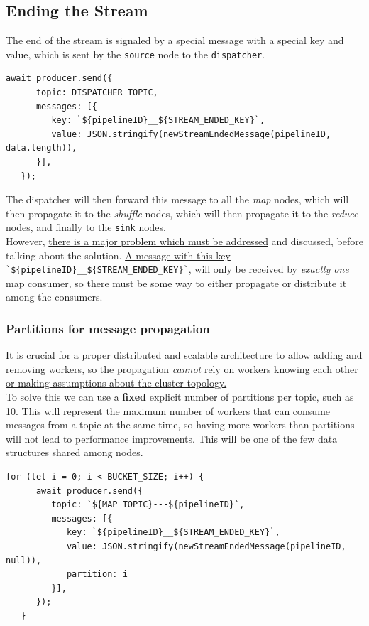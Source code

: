 \subsection{Ending the Stream}
The end of the stream is signaled by a special message with a special key and value, which is sent by the \texttt{source} node to the \texttt{dispatcher}.
\begin{lstlisting}[label={lst:streamEndedSource},caption={Sending STREAM\_ENDED message from source to dispatcher},captionpos={top}]
   await producer.send({
      topic: DISPATCHER_TOPIC,
      messages: [{
         key: `${pipelineID}__${STREAM_ENDED_KEY}`,
         value: JSON.stringify(newStreamEndedMessage(pipelineID, data.length)),
      }],
   });
\end{lstlisting}
 
The dispatcher will then forward this message to all the \textit{map} nodes, which will then propagate it to the \textit{shuffle} nodes, which will then propagate it to the \textit{reduce} nodes, and finally to the \texttt{sink} nodes.\\
However, \ul{there is a major problem which must be addressed} and discussed, before talking about the solution. \ul{A message with this key} \lstinline|`${pipelineID}__${STREAM_ENDED_KEY}`|, \ul{will only be received by \textit{exactly one} map consumer}, so there must be some way to either propagate or distribute it among the consumers.

\subsubsection{Partitions for message propagation}
\ul{It is crucial for a proper distributed and scalable architecture to allow adding and removing workers, so the propagation \textit{cannot} rely on workers knowing each other or making assumptions about the cluster topology.}\\
To solve this we can use a \textbf{fixed} explicit number of partitions per topic, such as 10. This will represent the maximum number of workers that can consume messages from a topic at the same time, so having more workers than partitions will not lead to performance improvements.
This will be one of the few data structures shared among nodes.

\begin{lstlisting}[label={lst:bucketsize},caption={BUCKET\_SIZE represents the number of partitions per topic},captionpos={top}]
   for (let i = 0; i < BUCKET_SIZE; i++) {
      await producer.send({
         topic: `${MAP_TOPIC}---${pipelineID}`,
         messages: [{
            key: `${pipelineID}__${STREAM_ENDED_KEY}`,
            value: JSON.stringify(newStreamEndedMessage(pipelineID, null)),
            partition: i
         }],
      });
   }
\end{lstlisting}


